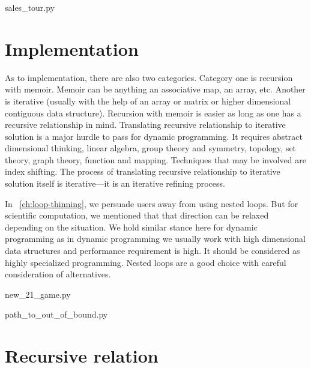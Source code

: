 \begin{clisting}
    
    {sales_tour.py}
\end{clisting}


\section{Implementation}\label{sec:dp-implementation}

As to implementation, there are also two categories.
Category one is recursion with memoir.
Memoir can be anything an associative map, an array, etc.
Another is iterative (usually with the help of an array or matrix or higher dimensional
contiguous data structure).
Recursion with memoir is easier as long as one has a recursive relationship in mind.
Translating recursive relationship to iterative solution is a major hurdle to pass for dynamic
programming.
It requires abstract dimensional thinking, linear algebra, group theory and symmetry, topology,
set theory, graph theory, function and mapping.
Techniques that may be involved are index shifting.
The process of translating recursive relationship to iterative solution itself is iterative---it
is an iterative refining process.

In ~\autoref{ch:loop-thinning}, we persuade users away from using nested loops.
But for scientific computation, we mentioned that that direction can be relaxed depending on the
situation.
We hold similar stance here for dynamic programming as in dynamic programming we usually work
with high dimensional data structures and performance requirement is high.
It should be considered as highly specialized programming.
Nested loops are a good choice with careful consideration of alternatives.

\begin{clisting}
    
    {new_21_game.py}
\end{clisting}

\begin{clisting}
    
    {path_to_out_of_bound.py}
\end{clisting}

\section{Recursive relation}\label{sec:recursive-relation}


